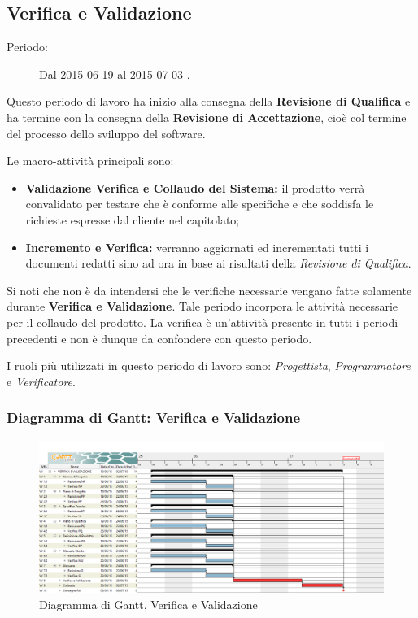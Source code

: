 \newpage
\subsection{Verifica e Validazione}
\begin{description}
	\item[Periodo:] Dal 2015-06-19 al 2015-07-03 .
\end{description}
Questo periodo di lavoro ha inizio alla consegna della \textbf{Revisione di Qualifica} e ha termine con la consegna della \textbf{Revisione di Accettazione}, cioè col termine del processo dello sviluppo del software.

\noindent Le macro-attività principali sono:
\begin{itemize}
	\item \textbf{Validazione Verifica e Collaudo del Sistema:} il prodotto verrà convalidato per testare che è conforme alle specifiche e che soddisfa le richieste espresse dal cliente nel capitolato;
	\item \textbf{Incremento e Verifica:} verranno aggiornati ed incrementati tutti i documenti redatti sino ad ora in base ai risultati della \textit{Revisione di Qualifica}.
\end{itemize}
Si noti che non è da intendersi che le verifiche necessarie vengano fatte solamente durante \textbf{Verifica e Validazione}. Tale periodo incorpora le attività necessarie per il collaudo del prodotto. La verifica è un'attività presente in tutti i periodi precedenti e non è dunque da confondere con questo periodo.

\noindent I ruoli più utilizzati in questo periodo di lavoro sono: \textit{Progettista}, \textit{Programmatore} e \textit{Verificatore}.
\subsubsection{Diagramma di Gantt: Verifica e Validazione}
\begin{figure}[h] 
	\centering
	\includegraphics[width=\textwidth]{./img/verifica_validazione.png}
	\caption{Diagramma di Gantt, Verifica e Validazione}
\end{figure}

